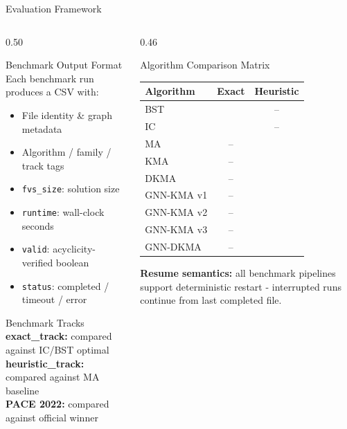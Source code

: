 \documentclass[aspectratio=169]{beamer}
\renewcommand{\footnotesize}{\tiny}
\begin{document}
\begin{frame}{Evaluation Framework}
	\tiny
	\begin{columns}[T]
		\begin{column}{0.50\textwidth}
			\begin{block}{Benchmark Output Format}
				Each benchmark run produces a CSV with:
				\begin{itemize}\setlength\itemsep{1pt}
					\item File identity \& graph metadata
					\item Algorithm / family / track tags
					\item \texttt{fvs\_size}: solution size
					\item \texttt{runtime}: wall-clock seconds
					\item \texttt{valid}: acyclicity-verified boolean
					\item \texttt{status}: completed / timeout / error
				\end{itemize}
			\end{block}
			\vspace{4pt}
			\begin{block}{Benchmark Tracks}
				\textbf{exact\_track:} compared against IC/BST optimal\\
				\textbf{heuristic\_track:} compared against MA baseline\\
				\textbf{PACE 2022:} compared against official winner
			\end{block}
		\end{column}
		\begin{column}{0.46\textwidth}
			\begin{block}{Algorithm Comparison Matrix}
				\begin{tabular}{lcc}
					\toprule
					Algorithm  & Exact      & Heuristic  \\
					\midrule
					BST        & \checkmark & --         \\
					IC         & \checkmark & --         \\
					MA         & --         & \checkmark \\
					KMA        & --         & \checkmark \\
					DKMA       & --         & \checkmark \\
					GNN-KMA v1 & --         & \checkmark \\
					GNN-KMA v2 & --         & \checkmark \\
					GNN-KMA v3 & --         & \checkmark \\
					GNN-DKMA   & --         & \checkmark \\
					\bottomrule
				\end{tabular}
			\end{block}
			\vspace{4pt}
			\begin{tcolorbox}[greenbox,fontupper=\footnotesize]
				\textbf{Resume semantics:} all benchmark
				pipelines support deterministic restart -
				interrupted runs continue from last completed file.
			\end{tcolorbox}
		\end{column}
	\end{columns}
\end{frame}
\end{document}
